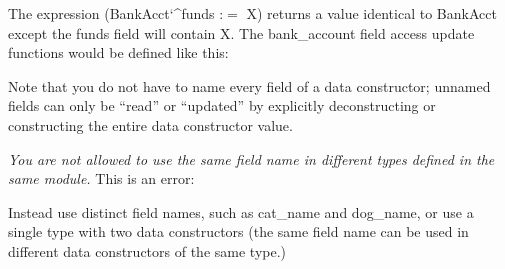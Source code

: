 \documentclass[a4paper,11pt,notitlepage,onecolumn]{book}
\begin{document}
The expression \textsf{(BankAcct\char`\^{}funds :{\ensuremath{=}} X)} returns a value identical to
\textsf{BankAcct} except the \textsf{funds} field will contain \textsf{X}.
The \textsf{bank\_account} field access update functions would be defined like this:
\begin{small}

\begin{ptabular}
\nextline
{}
\nextline
{}
\nextline
\end{ptabular}

\end{small}
Note that you do not have to name every field of a data constructor; unnamed
fields can only be ``read'' or ``updated'' by explicitly deconstructing or
constructing the entire data constructor value.

\emph{You are not allowed to use the same field name in
different types defined in the same module.}  This is an error:
\begin{small}

\begin{ptabular}
\nextline
{}
\nextline
\end{ptabular}

\end{small}
Instead use distinct field names, such as \textsf{cat\_name} and \textsf{dog\_name},
or use a single type with two data constructors (the same field
name can be used in different data constructors of the same type.)
\end{document}
